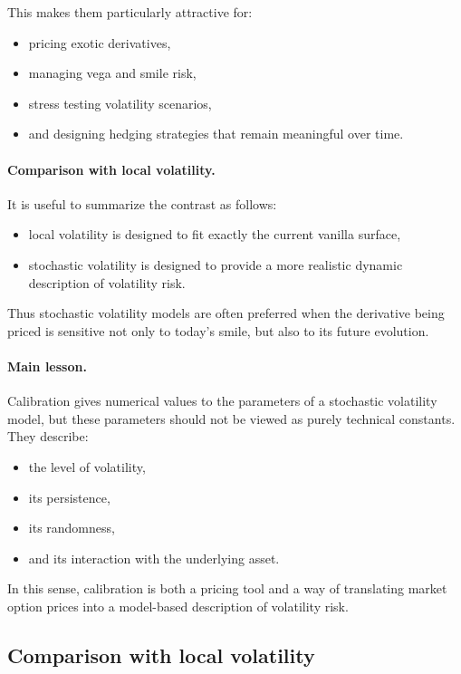 \documentclass[11pt]{article}
\theoremstyle{plain}
\theoremstyle{definition}
\theoremstyle{remark}
\begin{document}
This makes them particularly attractive for:
\begin{itemize}[leftmargin=1.4em]
    \item pricing exotic derivatives,
    \item managing vega and smile risk,
    \item stress testing volatility scenarios,
    \item and designing hedging strategies that remain meaningful over
    time.
\end{itemize}

\paragraph{Comparison with local volatility.}

It is useful to summarize the contrast as follows:
\begin{itemize}[leftmargin=1.4em]
    \item local volatility is designed to fit exactly the current
    vanilla surface,
    \item stochastic volatility is designed to provide a more realistic
    dynamic description of volatility risk.
\end{itemize}

Thus stochastic volatility models are often preferred when the
derivative being priced is sensitive not only to today's smile, but also
to its future evolution.

\paragraph{Main lesson.}

Calibration gives numerical values to the parameters of a stochastic
volatility model, but these parameters should not be viewed as purely
technical constants.
They describe:
\begin{itemize}[leftmargin=1.4em]
    \item the level of volatility,
    \item its persistence,
    \item its randomness,
    \item and its interaction with the underlying asset.
\end{itemize}

In this sense, calibration is both a pricing tool and a way of
translating market option prices into a model-based description of
volatility risk.

\subsection{Comparison with local volatility}
\end{document}
